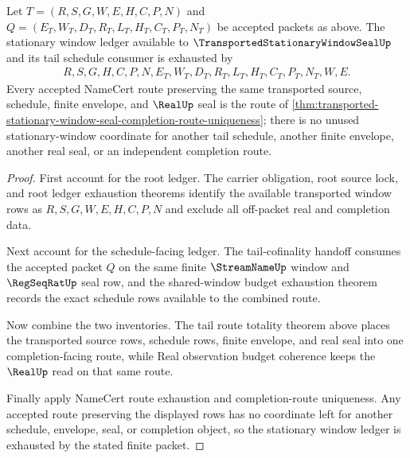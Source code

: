 \begin{theorem}
\label{thm:transported-stationary-window-seal-stationary-window-ledger-exhaustion}
Let $T=(R,S,G,W,E,H,C,P,N)$ and $Q=(E_T,W_T,D_T,R_T,L_T,H_T,C_T,P_T,N_T)$ be accepted packets as above. The stationary window ledger available to $\TransportedStationaryWindowSealUp$ and its tail schedule consumer is exhausted by
$$
\begin{aligned}
  R,S,G,H,C,P,N,
  E_T,W_T,D_T,R_T,L_T,H_T,C_T,P_T,N_T,
  W,E .
\end{aligned}
$$
Every accepted NameCert route preserving the same transported source, schedule, finite envelope, and $\RealUp$ seal is the route of \autoref{thm:transported-stationary-window-seal-completion-route-uniqueness}; there is no unused stationary-window coordinate for another tail schedule, another finite envelope, another real seal, or an independent completion route.
\end{theorem}
\begin{proof}
First account for the root ledger. The carrier obligation, root source lock, and root ledger exhaustion theorems identify the available transported window rows as $R,S,G,W,E,H,C,P,N$ and exclude all off-packet real and completion data.

Next account for the schedule-facing ledger. The tail-cofinality handoff consumes the accepted packet $Q$ on the same finite $\StreamNameUp$ window and $\RegSeqRatUp$ seal row, and the shared-window budget exhaustion theorem records the exact schedule rows available to the combined route.

Now combine the two inventories. The tail route totality theorem above places the transported source rows, schedule rows, finite envelope, and real seal into one completion-facing route, while Real observation budget coherence keeps the $\RealUp$ read on that same route.

Finally apply NameCert route exhaustion and completion-route uniqueness. Any accepted route preserving the displayed rows has no coordinate left for another schedule, envelope, seal, or completion object, so the stationary window ledger is exhausted by the stated finite packet.
\end{proof}
